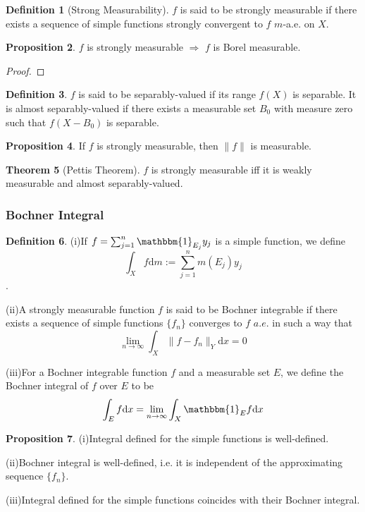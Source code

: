 \documentclass{article}
\theoremstyle{definition}
\newtheorem{definition}{Definition}[subsection]
\newtheorem{proposition}[definition]{Proposition}
\newtheorem{theorem}[definition]{Theorem}
\theoremstyle{remark}
\newcommand{\dif}{\mathrm{d}}
\begin{document}
\begin{definition}[Strong Measurability]
$f$ is said to be strongly measurable if there exists a sequence of simple functions strongly convergent to $f$ $m$-a.e. on $X$. 
\end{definition}

\begin{proposition}
$f$ is strongly measurable $\Rightarrow$ $f$ is Borel measurable. 
\end{proposition}
\begin{proof}

\end{proof}

\begin{definition}
$f$ is said to be separably-valued if its range $f(X)$ is separable. It is almost separably-valued if there exists a measurable set $B_0$ with measure zero such that $f(X-B_0)$ is separable. 
\end{definition}

\begin{proposition}
If $f$ is strongly measurable, then $\|f\|$ is measurable. 
\end{proposition}

\begin{theorem}[Pettis Theorem]
$f$ is strongly measurable iff it is weakly measurable and almost separably-valued. 
\end{theorem}

\subsubsection{Bochner Integral}
\begin{definition}
(i)If $f=\sum_{j=1}^n\mathbbm{1}_{E_j}y_j$ is a simple function, we define
$$\int_X f\dif m:=\sum_{j=1}^nm(E_j)y_j$$. 

(ii)A strongly measurable function $f$ is said to be Bochner integrable if there exists a sequence of simple functions $\{f_n\}$ converges to $f$ $a.e.$ in such a way that
$$\lim_{n\rightarrow\infty}\int_X\|f-f_n\|_Y\dif x=0$$

(iii)For a Bochner integrable function $f$ and a measurable set $E$, we define the Bochner integral of $f$ over $E$ to be
$$\int_Ef\dif x=\lim_{n\rightarrow\infty}\int_X\mathbbm{1}_E f\dif x$$
\end{definition}

\begin{proposition}
(i)Integral defined for the simple functions is well-defined. 

(ii)Bochner integral is well-defined, i.e. it is independent of the approximating sequence $\{f_n\}$. 

(iii)Integral defined for the simple functions coincides with their Bochner integral. 
\end{proposition}
\end{document}
